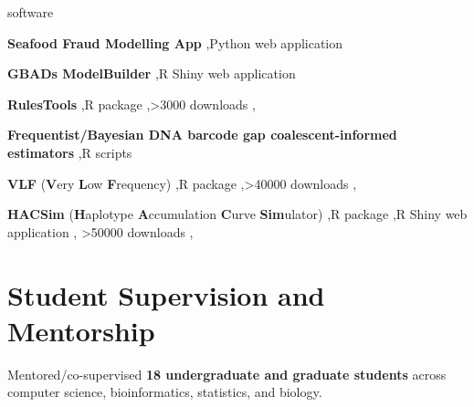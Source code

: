 \medskip
\begin{revlist}[itemsep=0.2\baselineskip]{software}
\item \textbf{Seafood Fraud Modelling App} \sep Python web application
\item \textbf{GBADs ModelBuilder} \sep R Shiny web application
\item \textbf{RulesTools} \sep R package \sep >3000 downloads \sep
\item \textbf{Frequentist/Bayesian DNA barcode gap coalescent-informed estimators}
  \sep R scripts
\item \textbf{VLF} (\textbf{V}ery \textbf{L}ow \textbf{F}requency) \sep R package
  \sep >40000 downloads \sep {}
\item \textbf{HACSim} (\textbf{H}aplotype \textbf{A}ccumulation \textbf{C}urve
  \textbf{Sim}ulator) \sep R package \sep R Shiny web application \sep
  >50000 downloads \sep {}
\end{revlist}

\section{Student Supervision and Mentorship}
Mentored/co-supervised \textbf{18 undergraduate and graduate students} across
computer science, bioinformatics, statistics, and biology.

\medskip
\legenddirect
\legendco

